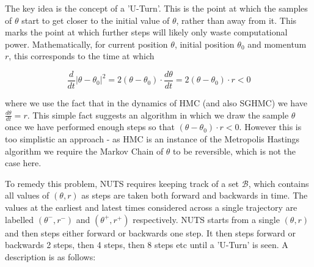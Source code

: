 The key idea is the concept of a 'U-Turn'. This is the point at which the samples of $\theta$ start to get closer to the initial value of $\theta$, rather than away from it. This marks the point at which further steps will likely only waste computational power. Mathematically, for current position $\theta$, initial position $\theta_0$ and momentum $r$, this corresponds to the time at which 

$$ \frac{d}{dt} |\theta - \theta_0|^2 = 2(\theta - \theta_0)\cdot\frac{d\theta}{dt} = 2(\theta - \theta_0)\cdot r< 0$$

where we use the fact that in the dynamics of HMC (and also SGHMC) we have $\frac{d\theta}{dt} = r$. This simple fact suggests an algorithm in which we draw the sample $\theta$ once we have performed enough steps so that $(\theta - \theta_0)\cdot r< 0$. However this is too simplistic an approach - as HMC is an instance of the Metropolis Hastings algorithm we require the Markov Chain of $\theta$ to be reversible, which is not the case here.

To remedy this problem, NUTS requires keeping track of a set $\mathcal{B}$, which contains all values of $(\theta, r)$ as steps are taken both forward and backwards in time. The values at the earliest and latest times considered across a single trajectory are labelled  $(\theta^-, r^-)$ and $(\theta^+, r^+)$ respectively. NUTS starts from a single $(\theta, r)$ and then steps either forward or backwards one step. It then steps forward or backwards 2 steps, then 4 steps, then 8 steps etc until a 'U-Turn' is seen. A description is as follows:

